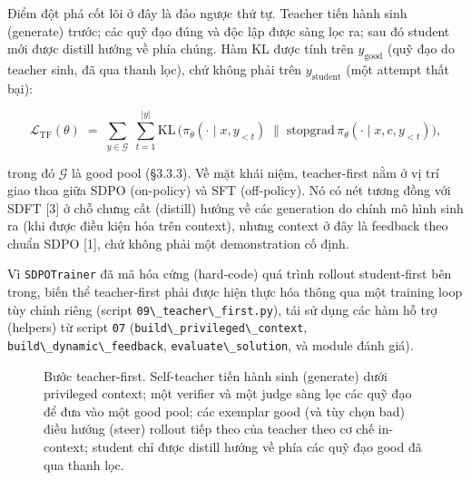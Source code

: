 Điểm đột phá cốt lõi ở đây là đảo ngược thứ tự. Teacher tiến hành sinh (generate) trước; các quỹ đạo đúng và độc lập được sàng lọc ra; sau đó student mới được distill hướng về phía chúng. Hàm KL được tính trên \(y_{\text{good}}\) (quỹ đạo do teacher sinh, đã qua thanh lọc), chứ không phải trên \(y_{\text{student}}\) (một attempt thất bại):

\[
\mathcal{L}_{\text{TF}}(\theta) \;=\; \sum_{y \in \mathcal{G}} \; \sum_{t=1}^{|y|} \mathrm{KL}\,\Big(\pi_\theta(\cdot \mid x, y_{<t}) \;\big\|\; \mathrm{stopgrad}\,\pi_\theta(\cdot \mid x, c, y_{<t})\Big),
\]

trong đó \(\mathcal{G}\) là good pool (§3.3.3). Về mặt khái niệm, teacher-first nằm ở vị trí giao thoa giữa SDPO (on-policy) và SFT (off-policy). Nó có nét tương đồng với SDFT {[}3{]} ở chỗ chưng cất (distill) hướng về các generation do chính mô hình sinh ra (khi được điều kiện hóa trên context), nhưng context ở đây là feedback theo chuẩn SDPO {[}1{]}, chứ không phải một demonstration cố định.

Vì \passthrough{\lstinline!SDPOTrainer!} đã mã hóa cứng (hard-code) quá trình rollout student-first bên trong, biến thể teacher-first phải được hiện thực hóa thông qua một training loop tùy chỉnh riêng (script \passthrough{\lstinline!09\_teacher\_first.py!}), tái sử dụng các hàm hỗ trợ (helpers) từ script \passthrough{\lstinline!07!} (\passthrough{\lstinline!build\_privileged\_context!}, \passthrough{\lstinline!build\_dynamic\_feedback!}, \passthrough{\lstinline!evaluate\_solution!}, và module đánh giá).

\begin{figure}[H]
\centering
{}
\caption{Bước teacher-first. Self-teacher tiến hành sinh (generate) dưới privileged context; một verifier và một judge sàng lọc các quỹ đạo để đưa vào một good pool; các exemplar good (và tùy chọn bad) điều hướng (steer) rollout tiếp theo của teacher theo cơ chế in-context; student chỉ được distill hướng về phía các quỹ đạo good đã qua thanh lọc.}
\label{fig:tf-step}
\end{figure}

